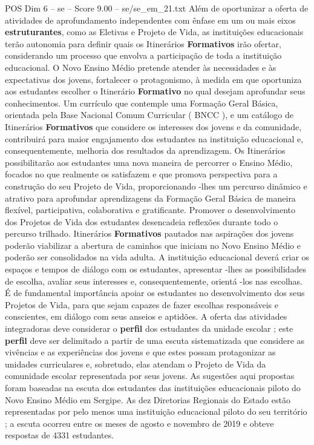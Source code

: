 \begin{textsample}{POS Dim 6 – se – Score 9.00 – se/se\_em\_21.txt}
Além de oportunizar a oferta de atividades de aprofundamento independentes com ênfase em um ou mais eixos \textbf{estruturantes}, como as Eletivas e Projeto de Vida, as instituições educacionais terão autonomia para definir quais os Itinerários \textbf{Formativos} irão ofertar, considerando um processo que envolva a participação de toda a instituição educacional.
O Novo Ensino Médio pretende atender às necessidades e às expectativas dos jovens, fortalecer o protagonismo, à medida em que oportuniza aos estudantes escolher o Itinerário \textbf{Formativo} no qual desejam aprofundar seus conhecimentos.
Um currículo que contemple uma Formação Geral Básica, orientada pela Base Nacional Comum Curricular ( BNCC ), e um catálogo de Itinerários \textbf{Formativos} que considere os interesses dos jovens e da comunidade, contribuirá para maior engajamento dos estudantes na instituição educacional e, consequentemente, melhoria dos resultados da aprendizagem.
Os Itinerários possibilitarão aos estudantes uma nova maneira de percorrer o Ensino Médio, focados no que realmente os satisfazem e que promova perspectiva para a construção do seu Projeto de Vida, proporcionando -lhes um percurso dinâmico e atrativo para aprofundar aprendizagens da Formação Geral Básica de maneira flexível, participativa, colaborativa e gratificante.
Promover o desenvolvimento dos Projetos de Vida dos estudantes desencadeia reflexões durante todo o percurso trilhado.
Itinerários \textbf{Formativos} pautados nas aspirações dos jovens poderão viabilizar a abertura de caminhos que iniciam no Novo Ensino Médio e poderão ser consolidados na vida adulta.
A instituição educacional deverá criar os espaços e tempos de diálogo com os estudantes, apresentar -lhes as possibilidades de escolha, avaliar seus interesses e, consequentemente, orientá -los nas escolhas.
É de fundamental importância apoiar os estudantes no desenvolvimento dos seus Projetos de Vida, para que sejam capazes de fazer escolhas responsáveis e conscientes, em diálogo com seus anseios e aptidões.
A oferta das atividades integradoras deve considerar o \textbf{perfil} dos estudantes da unidade escolar ; este \textbf{perfil} deve ser delimitado a partir de uma escuta sistematizada que considere as vivências e as experiências dos jovens e que estes possam protagonizar as unidades curriculares e, sobretudo, elas atendam o Projeto de Vida da comunidade escolar representada por seus jovens.
As sugestões aqui propostas foram baseadas na escuta dos estudantes das instituições educacionais piloto do Novo Ensino Médio em Sergipe.
As dez Diretorias Regionais do Estado estão representadas por pelo menos uma instituição educacional piloto do seu território ; a escuta ocorreu entre os meses de agosto e novembro de 2019 e obteve respostas de 4331 estudantes.

\end{textsample}
